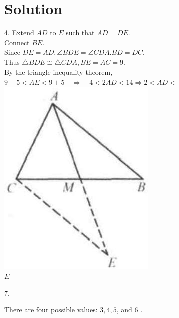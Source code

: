 \documentclass{article}
\begin{document}
\section*{Solution}
4.
Extend \(A D\) to \(E\) such that \(A D=D E\).\\
Connect \(B E\).\\
Since \(D E=A D, \angle B D E=\angle C D A . B D=D C\).\\
Thus \(\triangle B D E \cong \triangle C D A, B E=A C=9\).\\
By the triangle inequality theorem,\\
\(9-5<A E<9+5 \quad \Rightarrow \quad 4<2 A D<14 \Rightarrow 2<A D<\)\\
\centering
\includegraphics[width=\textwidth]{images/029(1).jpg}\\
\(E\)

7.

There are four possible values: \(3,4,5\), and 6 .
\end{document}
